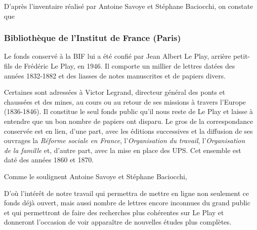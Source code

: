 D'après l'inventaire réalisé par Antoine Savoye et Stéphane Baciocchi, on constate que
\begin{quote}
\end{quote}

\subsubsection{Bibliothèque de l'Institut de France (Paris)}

Le fonds conservé à la BIF lui a été confié par Jean Albert Le Play, arrière petit-fils de Frédéric Le Play, en 1946. Il comporte un millier de lettres datées des années 1832-1882 et des liasses de notes manuscrites et de papiers divers.

Certaines sont adressées à Victor Legrand, directeur général des ponts et chaussées et des mines, au cours ou au retour de ses missions à travers l'Europe (1836-1846).
Il constitue le seul fonds public qu'il nous reste de Le Play et laisse à entendre que un bon nombre de papiers ont disparu. Le gros de la correspondance conservée est en lien, d'une part, avec les éditions successives et la diffusion de ses ouvrages la \emph{Réforme sociale en France}, l'\emph{Organisation du travail}, l'\emph{Organisation de la famille} et, d'autre part, avec la mise en place des UPS. Cet ensemble est daté des années 1860 et 1870. 

Comme le soulignent Antoine Savoye et Stéphane Baciocchi, 
\begin{quote}
\end{quote}
D'où l'intérêt de notre travail qui permettra de mettre en ligne non seulement ce fonds déjà ouvert, mais aussi nombre de lettres encore inconnues du grand public et qui permettront de faire des recherches plus cohérentes sur Le Play et donneront l'occasion de voir apparaître de nouvelles études plus complètes.

